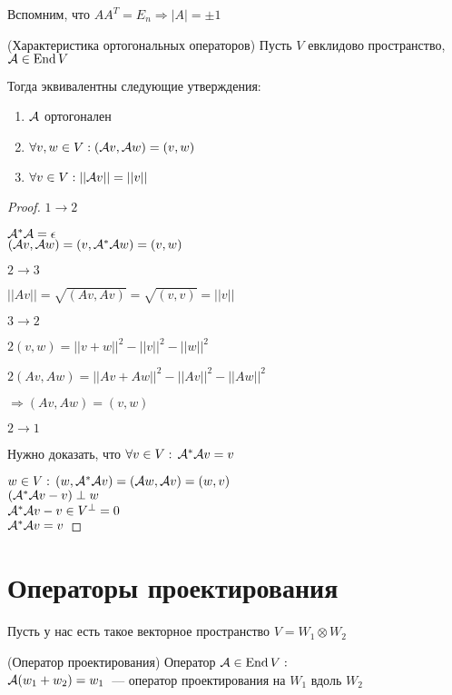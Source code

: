Вспомним, что $AA^T = E_n \Longrightarrow |A| = \pm 1$

\begin{theorem}(Характеристика ортогональных операторов)
    Пусть $V$ евклидово пространство, $\mathcal{A} \in \operatorname{End}{V}$ 

    Тогда эквивалентны следующие утверждения:
    \begin{enumerate}
        \item $\mathcal{A}$ ортогонален
        \item $\forall v, w \in V: (\mathcal{A} v, \mathcal{A} w) = (v, w)$
        \item $\forall v \in V: ||\mathcal{A} v|| = || v || $
    \end{enumerate}
    \begin{proof}
        $1 \to 2$

        $\mathcal{A}^* \mathcal{A} = \epsilon$ \\ %
        $(\mathcal{A} v, \mathcal{A} w) = (v, \mathcal{A}^*\mathcal{A} w) = (v, w)$

        $2 \to 3 $

        $||Av|| = \sqrt{(Av, Av)} = \sqrt{(v, v)} = ||v||$

        $3 \to 2$
        
        $2(v, w) = ||v + w||^2 - ||v||^2 - ||w||^2$

        $2(Av, Aw) = ||Av + Aw||^2 - ||Av||^2 - ||Aw||^2$
        
        $\Longrightarrow (Av, Aw) = (v, w)$

        $2 \to 1$

        Нужно доказать, что $\forall v \in V: \, \mathcal{A}^* \mathcal{A} v = v$

        $w \in V: \, (w, \mathcal{A}^* \mathcal{A} v) = (\mathcal{A} w, \mathcal{A} v) = (w, v)$ \\
        $(\mathcal{A}^* \mathcal{A} v - v) \perp w$ \\
        $\mathcal{A}^* \mathcal{A} v - v \in V^{\perp} = 0$ \\
        $\mathcal{A}^* \mathcal{A} v = v$
    \end{proof}    
\end{theorem}


\section*{Операторы проектирования}

Пусть у нас есть такое векторное пространство $V = W_1 \otimes W_2$

\begin{conj}(Оператор проектирования)
    Оператор $\mathcal{A} \in \operatorname{End}{V}:$ \\
    $\mathcal{A}(w_1 + w_2) = w_1$~--- оператор проектирования на $W_1$ вдоль $W_2$
\end{conj}

